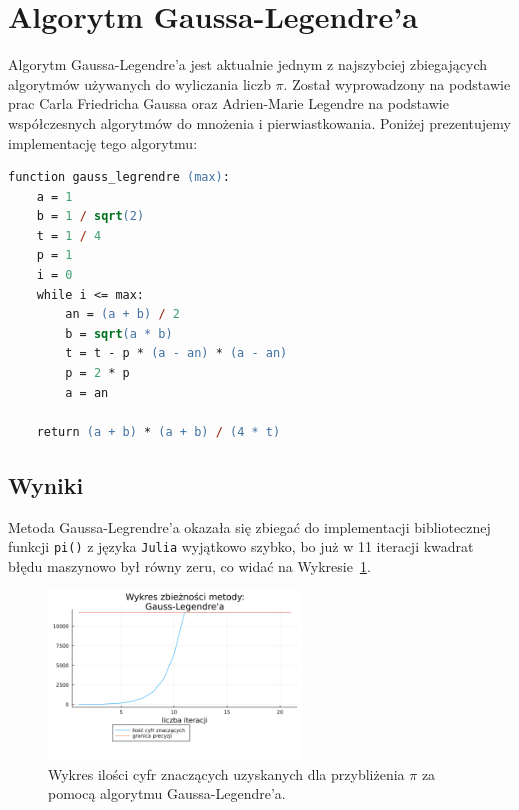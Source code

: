 \section{Algorytm Gaussa-Legendre'a}

Algorytm Gaussa-Legendre'a jest aktualnie jednym z najszybciej zbiegających algorytmów używanych do wyliczania liczb $\pi$. Został wyprowadzony na podstawie prac Carla Friedricha Gaussa oraz Adrien-Marie Legendre na podstawie współczesnych algorytmów do mnożenia i pierwiastkowania. Poniżej prezentujemy implementację tego algorytmu\cite{gausse2}:

\newpage

\begin{lstlisting}[language=ps]
function gauss_legrendre (max):
    a = 1
    b = 1 / sqrt(2)
    t = 1 / 4
    p = 1
    i = 0
    while i <= max:
        an = (a + b) / 2
        b = sqrt(a * b)
        t = t - p * (a - an) * (a - an)
        p = 2 * p
        a = an
    
    return (a + b) * (a + b) / (4 * t)
\end{lstlisting}

\subsection{Wyniki}

Metoda Gaussa-Legrendre'a okazała się zbiegać do implementacji bibliotecznej funkcji \verb+pi()+ z języka \verb+Julia+ wyjątkowo szybko, bo już w 11 iteracji kwadrat błędu maszynowo był równy zeru, co widać na Wykresie~\ref{gauss-error}.

\begin{figure}[!h]
    \centering
    \renewcommand{\figurename}{Wykres}
    \includegraphics[width=0.6\textwidth]{../prog/gauss_legendre_log_error.png}
    \caption{Wykres ilości cyfr znaczących uzyskanych dla przybliżenia  $\pi$ za pomocą algorytmu Gaussa-Legendre'a.}
    \label{gauss-error}
\end{figure}


